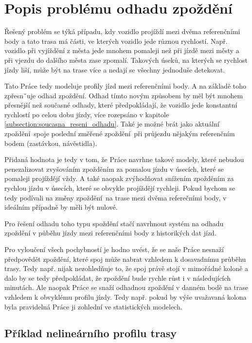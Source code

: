 \section{Popis problému odhadu zpoždění}

Řešený problém se týká případu, kdy vozidlo projíždí mezi dvěma referenčními body a tato trasa má části, ve kterých vozidlo jede různou rychlostí. Např. vozidlo při vyjíždění z města jede mnohem pomaleji než při jízdě mezi městy a při vjezdu do dalšího města zase zpomalí. Takových úseků, na kterých se rychlost jízdy liší, může být na trase více a nedají se všechny jednoduše detekovat.

\bigbreak

Tato Práce tedy modeluje profily jízd mezi referenčními body. A na základě toho zpřesnˇuje odhad zpoždění. Odhad tímto novým způsobem by měl být mnohem přesnější než současné odhady, které předpokládají, že vozidlo jede konstantní rychlostí po celou dobu jízdy, více rozepsáno v kapitole \ref{subsection:soucasna_reseni_odhadu}. Také je možné brát jako aktuální zpoždění spoje poslední změřené zpoždění při průjezdu nějakým referenčním bodem (zastávkou, návěstidla).

\bigbreak

Přidaná hodnota je tedy v tom, že Práce navrhne takové modely, které nebudou penezalizovat zvyšováním zpožděním za pomalou jízdu v úsecích, které se pomaleji projíždějí vždy. A také naopak zvýhodňovat snížením zpožděním za rychlou jízdu v úsecích, které se obvykle projíždějí rychleji. Pokud bychom se tedy podívali na změny zpoždění na trase mezi dvěma referečními body, v ideálním případně by měli být nulové.

\bigbreak

Pro řešení odhadu toho typu spoždění stačí navrhnout systém na odhadu zpoždění v půběhu jízdy mezi referenčními body z historikých dat jízd.

\bigbreak

Pro vyloučení všech pochybností je hodno uvést, že se naše Práce nesnaží předpovědět zpoždění, které spoj může nabrat vzhledem k dosavadnímu průběhu trasy. Tedy např. nijak nezohledňuje to, že spoj právě stojí v mimořádné koloně a dalo by se tedy předpokládat, že zpoždění bude rychle růst i v následujících minutách. Ale naopak Práce se snaží odhadnou zpoždění v danném bodě na trase vzhledem k obvyklému profilu jízdy. Tedy např. pokud by výše uvažavaná kolona byla pravidelná Práce ji zohlední ve statistických modelech.


\subsection{Příklad nelineárního profilu trasy} \label{subsection:priklad_nelinearni_trasa}

